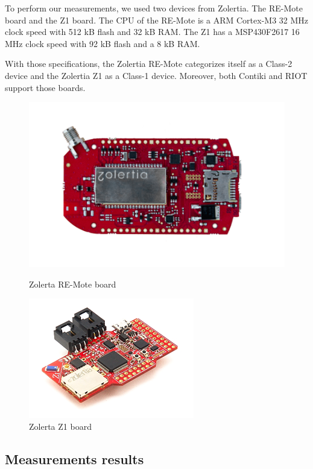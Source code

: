 To perform our measurements, we used two devices from Zolertia.
The RE-Mote board\cite{zolertia-remote} and the Z1 board\cite{zolertia-z1}.
The CPU of the RE-Mote is a ARM Cortex-M3\cite{arm-cortex-m3} 32 MHz clock speed with 512 kB flash and 32 kB RAM.
The Z1 has a MSP430F2617\cite{msp430} 16 MHz clock speed with 92 kB flash and a 8 kB RAM.

With those specifications, the Zolertia RE-Mote categorizes itself as a Class-2 device and the Zolertia Z1 as a Class-1 device.
Moreover, both Contiki and RIOT support those boards.

\begin{figure}[!ht]
    \begin{minipage}{.45\textwidth}
        \centering
        \includegraphics[scale=.5]{assets/remote.png}
        \caption{Zolerta RE-Mote board}
    \end{minipage}\hfill
    \begin{minipage}{.45\textwidth}        
        \centering
        \includegraphics[scale=2.5]{assets/z1.png}
        \caption{Zolerta Z1 board}
    \end{minipage}
\end{figure}

\subsection{Measurements results\label{sec:ref-measurements}}

